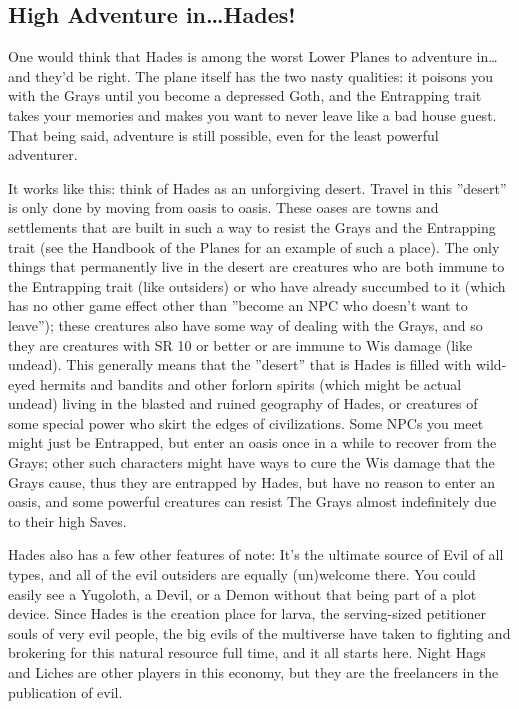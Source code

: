 \subsection{High Adventure in\ldots Hades!}

One would think that Hades is among the worst Lower Planes to adventure in\ldots and they'd be right. The plane itself has the two nasty qualities: it poisons you with the Grays until you become a depressed Goth, and the Entrapping trait takes your memories and makes you want to never leave like a bad house guest. That being said, adventure is still possible, even for the least powerful adventurer.

It works like this: think of Hades as an unforgiving desert. Travel in this ''desert'' is only done by moving from oasis to oasis. These oases are towns and settlements that are built in such a way to resist the Grays and the Entrapping trait (see the Handbook of the Planes for an example of such a place). The only things that permanently live in the desert are creatures who are both immune to the Entrapping trait (like outsiders) or who have already succumbed to it (which has no other game effect other than ''become an NPC who doesn't want to leave''); these creatures also have some way of dealing with the Grays, and so they are creatures with SR 10 or better or are immune to Wis damage (like undead). This generally means that the ''desert'' that is Hades is filled with wild-eyed hermits and bandits and other forlorn spirits (which might be actual undead) living in the blasted and ruined geography of Hades, or creatures of some special power who skirt the edges of civilizations. Some NPCs you meet might just be Entrapped, but enter an oasis once in a while to recover from the Grays; other such characters might have ways to cure the Wis damage that the Grays cause, thus they are entrapped by Hades, but have no reason to enter an oasis, and some powerful creatures can resist The Grays almost indefinitely due to their high Saves.

Hades also has a few other features of note: It's the ultimate source of Evil of all types, and all of the evil outsiders are equally (un)welcome there. You could easily see a Yugoloth, a Devil, or a Demon without that being part of a plot device. Since Hades is the creation place for larva, the serving-sized petitioner souls of very evil people, the big evils of the multiverse have taken to fighting and brokering for this natural resource full time, and it all starts here. Night Hags and Liches are other players in this economy, but they are the freelancers in the publication of evil.

